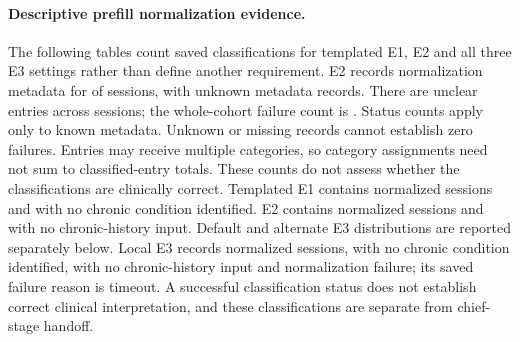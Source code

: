 \paragraph{Descriptive prefill normalization evidence.}
The following tables count saved classifications for templated E1, E2 and all
three E3 settings rather than define another requirement. E2 records normalization metadata for \ETwoPrefillKnown{} of
\ETwoPrefillSessions{} sessions, with \ETwoPrefillUnknown{} unknown metadata
records. There are \ETwoPrefillUnclearEntries{} unclear entries across
\ETwoPrefillUnclearSessions{} sessions; the whole-cohort failure count is
\ETwoPrefillFailed{}. Status counts apply only to known metadata. Unknown or
missing records cannot establish zero failures. Entries may receive multiple
categories, so category assignments need not sum to classified-entry totals.
These counts do not assess whether the classifications are clinically correct.
Templated E1 contains \EOnePrefillStatusNormalized{} normalized sessions and
\EOnePrefillStatusNoChronicIdentified{} with no chronic condition identified.
E2 contains \ETwoPrefillStatusNormalized{} normalized sessions and
\ETwoPrefillStatusNoChronic{} with no chronic-history input. Default and alternate
E3 distributions are reported separately below. Local E3 records
\EThreeLocalPrefillStatusNormalized{} normalized sessions,
\EThreeLocalPrefillStatusNoChronicIdentified{} with no chronic condition identified,
\EThreeLocalPrefillStatusNoChronic{} with no chronic-history input and
\EThreeLocalPrefillFailed{} normalization failure; its saved failure reason is
timeout. A successful classification status does not establish correct clinical
interpretation, and these classifications are separate from chief-stage handoff.
{\small\setlength{\LTcapwidth}{\linewidth}}

